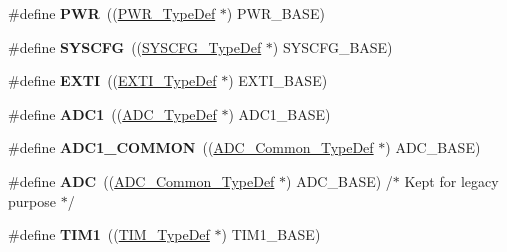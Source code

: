 \begin{DoxyCompactItemize}
\item 
\mbox{\label{group___peripheral__declaration_ga04651c526497822a859942b928e57f8e}} 
\#define {\bfseries P\+WR}~((\hyperlink{struct_p_w_r___type_def}{P\+W\+R\+\_\+\+Type\+Def} $\ast$) P\+W\+R\+\_\+\+B\+A\+SE)
\item 
\mbox{\label{group___peripheral__declaration_ga3c833fe1c486cb62250ccbca32899cb8}} 
\#define {\bfseries S\+Y\+S\+C\+FG}~((\hyperlink{struct_s_y_s_c_f_g___type_def}{S\+Y\+S\+C\+F\+G\+\_\+\+Type\+Def} $\ast$) S\+Y\+S\+C\+F\+G\+\_\+\+B\+A\+SE)
\item 
\mbox{\label{group___peripheral__declaration_ga9189e770cd9b63dadd36683eb9843cac}} 
\#define {\bfseries E\+X\+TI}~((\hyperlink{struct_e_x_t_i___type_def}{E\+X\+T\+I\+\_\+\+Type\+Def} $\ast$) E\+X\+T\+I\+\_\+\+B\+A\+SE)
\item 
\mbox{\label{group___peripheral__declaration_ga90d2d5c526ce5c0a551f533eccbee71a}} 
\#define {\bfseries A\+D\+C1}~((\hyperlink{struct_a_d_c___type_def}{A\+D\+C\+\_\+\+Type\+Def} $\ast$) A\+D\+C1\+\_\+\+B\+A\+SE)
\item 
\mbox{\label{group___peripheral__declaration_gaf1919c64fc774aab31190346fd5457e2}} 
\#define {\bfseries A\+D\+C1\+\_\+\+C\+O\+M\+M\+ON}~((\hyperlink{struct_a_d_c___common___type_def}{A\+D\+C\+\_\+\+Common\+\_\+\+Type\+Def} $\ast$) A\+D\+C\+\_\+\+B\+A\+SE)
\item 
\mbox{\label{group___peripheral__declaration_ga54d148b91f3d356713f7e367a2243bea}} 
\#define {\bfseries A\+DC}~((\hyperlink{struct_a_d_c___common___type_def}{A\+D\+C\+\_\+\+Common\+\_\+\+Type\+Def} $\ast$) A\+D\+C\+\_\+\+B\+A\+SE) /$\ast$ Kept for legacy purpose $\ast$/
\item 
\mbox{\label{group___peripheral__declaration_ga2e87451fea8dc9380056d3cfc5ed81fb}} 
\#define {\bfseries T\+I\+M1}~((\hyperlink{struct_t_i_m___type_def}{T\+I\+M\+\_\+\+Type\+Def} $\ast$) T\+I\+M1\+\_\+\+B\+A\+SE)
\item 
\mbox{\label{group___peripheral__declaration_gad483be344a28ac800be8f03654a9612f}} 

\end{DoxyCompactItemize}
